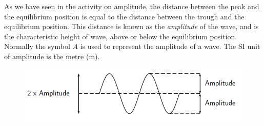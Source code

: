         \label{m38806*id318427}As we have seen in the activity on amplitude, the distance between the peak and the equilibrium position is equal to the distance between the trough and the equilibrium position. This distance is known as the \textsl{amplitude} of the wave, and is the characteristic height of wave, above or below the equilibrium position. Normally the symbol $A$ is used to represent the amplitude of a wave. The SI unit of amplitude is the metre (m).\par 
        \label{m38806*id318448}
    \setcounter{subfigure}{0}
	\begin{figure}[H] %
    \begin{center}
    \label{m38806*id318451!!!underscore!!!media}\label{m38806*id318451!!!underscore!!!printimage}\includegraphics[width=0.8\columnwidth]{col11305.imgs/m38806_PG10C5_006.png} %
      \vspace{2pt}
    \vspace{.1in}
    \end{center}
 \end{figure}       
        \par 
\label{m38806*secfhsst!!!underscore!!!id212}\vspace{.5cm} 
      \noindent
